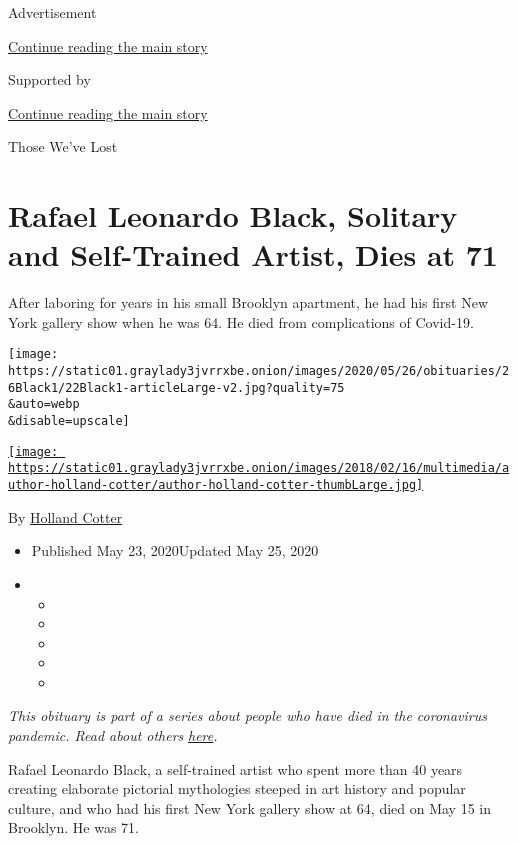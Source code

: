 Advertisement

\protect\hyperlink{after-top}{Continue reading the main story}

Supported by

\protect\hyperlink{after-sponsor}{Continue reading the main story}

Those We've Lost

\hypertarget{rafael-leonardo-black-solitary-and-self-trained-artist-dies-at-71}{%
\section{Rafael Leonardo Black, Solitary and Self-Trained Artist, Dies
at
71}\label{rafael-leonardo-black-solitary-and-self-trained-artist-dies-at-71}}

After laboring for years in his small Brooklyn apartment, he had his
first New York gallery show when he was 64. He died from complications
of Covid-19.

\texttt{[image: https://static01.graylady3jvrrxbe.onion/images/2020/05/26/obituaries/26Black1/22Black1-articleLarge-v2.jpg?quality=75\\\&auto=webp\\\&disable=upscale]}

\href{https://www.nytimes3xbfgragh.onion/by/holland-cotter}{\texttt{[image: https://static01.graylady3jvrrxbe.onion/images/2018/02/16/multimedia/author-holland-cotter/author-holland-cotter-thumbLarge.jpg]}}

By \href{https://www.nytimes3xbfgragh.onion/by/holland-cotter}{Holland
Cotter}

\begin{itemize}
\item
  Published May 23, 2020Updated May 25, 2020
\item
  \begin{itemize}
  \item
  \item
  \item
  \item
  \item
  \end{itemize}
\end{itemize}

\emph{This obituary is part of a series about people who have died in
the coronavirus pandemic. Read about others}
\href{https://www.nytimes3xbfgragh.onion/series/people-who-have-died-of-the-coronavirus}{\emph{here}}\emph{.}

Rafael Leonardo Black, a self-trained artist who spent more than 40
years creating elaborate pictorial mythologies steeped in art history
and popular culture, and who had his first New York gallery show at 64,
died on May 15 in Brooklyn. He was 71.

